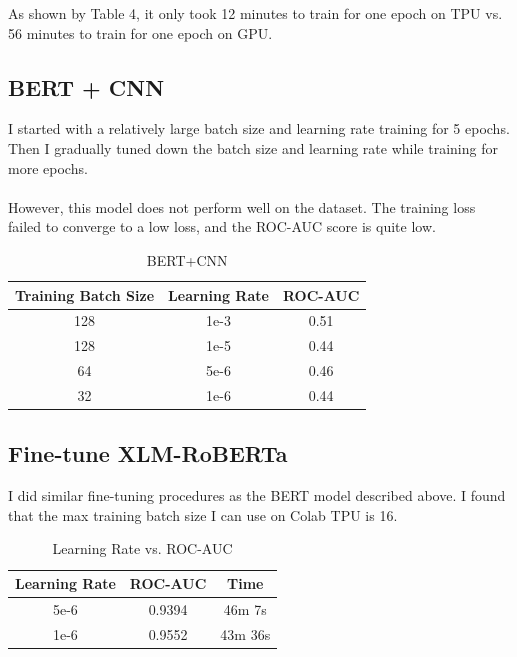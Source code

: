 \documentclass[11pt,a4paper]{article}
\begin{document}
\noindent As shown by Table 4, it only took 12 minutes to train for one epoch on TPU vs. 56 minutes to train for one epoch on GPU.\\

\subsection{BERT + CNN}

I started with a relatively large batch size and learning rate training for 5 epochs. Then I gradually tuned down the batch size and learning rate while training for more epochs.\\
\\
However, this model does not perform well on the dataset. The training loss failed to converge to a low loss, and the ROC-AUC score is quite low.\\

\begin{table}[!htbp]
	\centering
	\begin{tabular}{|c|c|c|}
		\hline
		Training Batch Size & Learning Rate & ROC-AUC \\ \hline
		128                 & 1e-3          & 0.51    \\ \hline
		128                 & 1e-5          & 0.44    \\ \hline
		64                  & 5e-6          & 0.46    \\ \hline
		32                  & 1e-6          & 0.44    \\ \hline
	\end{tabular}
	\caption{\label{table:my-label} BERT+CNN}
\end{table}

\subsection{Fine-tune XLM-RoBERTa}

I did similar fine-tuning procedures as the BERT model described above. I found that the max training batch size I can use on Colab TPU is 16.

\begin{table}[!htbp]
	\centering
	\begin{tabular}{|c|c|c|}
		\hline
		Learning Rate                & ROC-AUC & Time    \\ \hline
		5e-6  & 0.9394  & 46m 7s  \\ \hline
		1e-6   & 0.9552  & 43m 36s \\ \hline
	\end{tabular}
	\caption{\label{table:my-label} Learning Rate vs. ROC-AUC}
\end{table}
\end{document}
